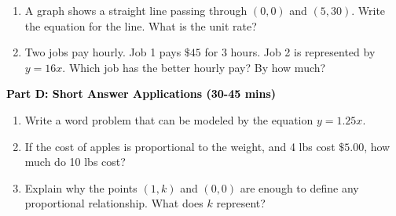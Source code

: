 \documentclass[12pt, letterpaper, fleqn]{article}
\begin{document}
\begin{enumerate}[itemsep=4.2cm, leftmargin=0.6cm, resume]
\item A graph shows a straight line passing through $(0,0)$ and $(5, 30)$. Write the equation for the line. What is the unit rate?
\item Two jobs pay hourly. Job 1 pays $\$45$ for 3 hours. Job 2 is represented by $y = 16x$. Which job has the better hourly pay? By how much?
\end{enumerate}

\newpage

\begin{tcolorbox}[colback=customteal!20]
\large\textcolor{black}{\textbf{Part D: Short Answer Applications (30-45 mins)}}
\end{tcolorbox}

\vspace{3mm}

\begin{enumerate}[itemsep=4.2cm, leftmargin=0.6cm, resume]
\item Write a word problem that can be modeled by the equation $y = 1.25x$.
\item If the cost of apples is proportional to the weight, and 4 lbs cost $\$5.00$, how much do 10 lbs cost?
\item Explain why the points $(1, k)$ and $(0,0)$ are enough to define any proportional relationship. What does $k$ represent?
\end{enumerate}
\end{document}
